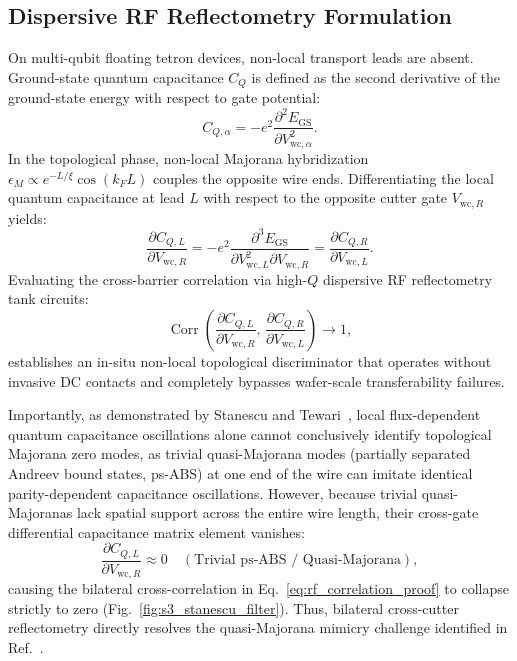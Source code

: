\documentclass[aps,prb,reprint,superscriptaddress,showpacs,amsmath,amssymb]{revtex4-2}
\begin{document}
\subsection{Dispersive RF Reflectometry Formulation}
On multi-qubit floating tetron devices, non-local transport leads are absent. Ground-state quantum capacitance $C_Q$ is defined as the second derivative of the ground-state energy with respect to gate potential:
\begin{equation}
C_{Q, \alpha} = -e^2 \frac{\partial^2 E_{\mathrm{GS}}}{\partial V_{\mathrm{wc}, \alpha}^2}.
\label{eq:cq_def}
\end{equation}
In the topological phase, non-local Majorana hybridization $\epsilon_M \propto e^{-L/\xi} \cos(k_F L)$ couples the opposite wire ends. Differentiating the local quantum capacitance at lead $L$ with respect to the opposite cutter gate $V_{\mathrm{wc}, R}$ yields:
\begin{equation}
\frac{\partial C_{Q, L}}{\partial V_{\mathrm{wc}, R}} = -e^2 \frac{\partial^3 E_{\mathrm{GS}}}{\partial V_{\mathrm{wc}, L}^2 \partial V_{\mathrm{wc}, R}} = \frac{\partial C_{Q, R}}{\partial V_{\mathrm{wc}, L}}.
\label{eq:maxwell_relation}
\end{equation}
Evaluating the cross-barrier correlation via high-$Q$ dispersive RF reflectometry tank circuits:
\begin{equation}
\operatorname{Corr}\left( \frac{\partial C_{Q, L}}{\partial V_{\mathrm{wc}, R}}, \, \frac{\partial C_{Q, R}}{\partial V_{\mathrm{wc}, L}} \right) \longrightarrow 1,
\label{eq:rf_correlation_proof}
\end{equation}
establishes an in-situ non-local topological discriminator that operates without invasive DC contacts and completely bypasses wafer-scale transferability failures.

Importantly, as demonstrated by Stanescu and Tewari~\cite{Stanescu2026}, local flux-dependent quantum capacitance oscillations alone cannot conclusively identify topological Majorana zero modes, as trivial quasi-Majorana modes (partially separated Andreev bound states, ps-ABS) at one end of the wire can imitate identical parity-dependent capacitance oscillations. However, because trivial quasi-Majoranas lack spatial support across the entire wire length, their cross-gate differential capacitance matrix element vanishes:
\begin{equation}
\frac{\partial C_{Q, L}}{\partial V_{\mathrm{wc}, R}} \approx 0 \quad (\text{Trivial ps-ABS / Quasi-Majorana}),
\label{eq:quasi_majorana_null}
\end{equation}
causing the bilateral cross-correlation in Eq.~\eqref{eq:rf_correlation_proof} to collapse strictly to zero (Fig.~\ref{fig:s3_stanescu_filter}). Thus, bilateral cross-cutter reflectometry directly resolves the quasi-Majorana mimicry challenge identified in Ref.~\cite{Stanescu2026}.
\end{document}
